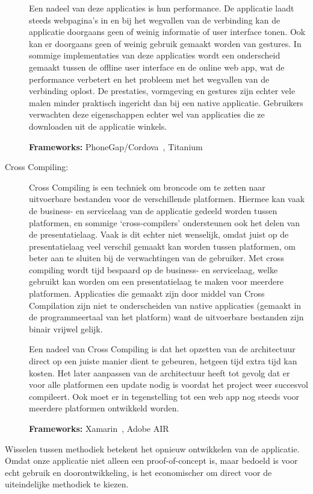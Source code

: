 \begin{description}
Een nadeel van deze applicaties is hun performance. De applicatie laadt steeds webpagina's in en bij het wegvallen van de verbinding kan de applicatie doorgaans geen of weinig informatie of user interface tonen. Ook kan er doorgaans geen of weinig gebruik gemaakt worden van gestures. In sommige implementaties van deze applicaties wordt een onderscheid gemaakt tussen de offline user interface en de online web app, wat de performance verbetert en het probleem met het wegvallen van de verbinding oplost. De prestaties, vormgeving en gestures zijn echter vele malen minder praktisch ingericht dan bij een native applicatie. Gebruikers verwachten deze eigenschappen echter wel van applicaties die ze downloaden uit de applicatie winkels.
    
\textbf{Frameworks:} PhoneGap/Cordova~\cite{cordova}, Titanium~\cite{titanium}
    
\item[Cross Compiling: ] Cross Compiling is een techniek om broncode om te zetten naar uitvoerbare bestanden voor de verschillende platformen. Hiermee kan vaak de business- en servicelaag van de applicatie gedeeld worden tussen platformen, en sommige `cross-compilers' ondersteunen ook het delen van de presentatielaag. Vaak is dit echter niet wenselijk, omdat juist op de presentatielaag veel verschil gemaakt kan worden tussen platformen, om beter aan te sluiten bij de verwachtingen van de gebruiker. Met cross compiling wordt tijd bespaard op de business- en servicelaag, welke gebruikt kan worden om een presentatielaag te maken voor meerdere platformen. Applicaties die gemaakt zijn door middel van Cross Compilation zijn niet te onderscheiden van native applicaties (gemaakt in de programmeertaal van het platform) want de uitvoerbare bestanden zijn binair vrijwel gelijk.
    
Een nadeel van Cross Compiling is dat het opzetten van de architectuur direct op een juiste manier dient te gebeuren, hetgeen tijd extra tijd kan kosten. Het later aanpassen van de architectuur heeft tot gevolg dat er voor alle platformen een update nodig is voordat het project weer succesvol compileert. Ook moet er in tegenstelling tot een web app nog steeds voor meerdere platformen ontwikkeld worden.
    
\textbf{Frameworks:} Xamarin~\cite{xamarin}, Adobe AIR~\cite{adobeair}
\end{description}
    
Wisselen tussen methodiek betekent het opnieuw ontwikkelen van de applicatie. Omdat onze applicatie niet alleen een proof-of-concept is, maar bedoeld is voor echt gebruik en doorontwikkeling, is het economischer om direct voor de uiteindelijke methodiek te kiezen.
    
